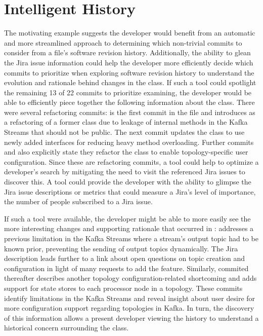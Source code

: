 
\section{Intelligent History}

The motivating example suggests the developer would benefit from an automatic 
and more streamlined approach to determining which non-trivial commits to consider from a file's software revision history.
Additionally, the ability to glean the Jira issue information could help the developer 
more efficiently decide which commits to prioritize when exploring software revision history to understand 
the evolution and rationale behind changes in the  class.
If such a tool could spotlight the remaining 13 of 22 commits to prioritize examining, 
the developer would be able to efficiently piece together the following information about the  class. 
There were several refactoring commits:  is the first commit in the file and introduces  as a refactoring of a former class due to leakage of internal methods in the Kafka Streams  that should not be public. 
The next commit  updates the  class to use newly added interfaces for reducing heavy method overloading.
Further commits  and  also explicitly state they refactor the  class to enable topology-specific user configuration.
Since these are refactoring commits, a tool could help to optimize a developer's search by mitigating the need to visit the referenced Jira issues to discover this.
A tool could provide the developer with the ability to glimpse the Jira issue descriptions 
or metrics that could measure a Jira's level of importance, \eg the number of people subscribed to a Jira issue.

If such a tool were available, the developer might be able to more easily see the more interesting changes and supporting rationale that occurred in :
 addresses a previous limitation in the Kafka Streams  where a stream's output topic had to be known prior, preventing the sending of output topics dynamically. 
The Jira description leads further to a link about open questions on topic creation and configuration in light of many requests to add the feature.
Similarly,  commited thereafter describes another topology configuration-related shortcoming and adds support for state stores to each processor node in a topology.
These commits identify limitations in the Kafka Streams  and reveal insight about user desire for more configuration support regarding topologies in Kafka. 
In turn, the discovery of this information allows a present developer viewing the history to understand a historical concern surrounding the  class.

